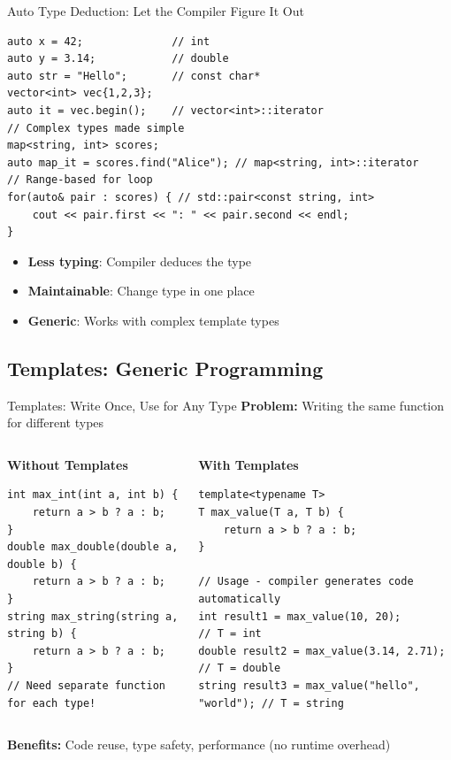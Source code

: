 \begin{frame}[fragile]{Auto Type Deduction: Let the Compiler Figure It Out}
	\begin{verbatim}
auto x = 42;              // int
auto y = 3.14;            // double
auto str = "Hello";       // const char*
vector<int> vec{1,2,3};
auto it = vec.begin();    // vector<int>::iterator
// Complex types made simple
map<string, int> scores;
auto map_it = scores.find("Alice"); // map<string, int>::iterator
// Range-based for loop
for(auto& pair : scores) { // std::pair<const string, int>
    cout << pair.first << ": " << pair.second << endl;
}
			\end{verbatim}
	\begin{itemize}
		\item \textbf{Less typing}: Compiler deduces the type
		\item \textbf{Maintainable}: Change type in one place
		\item \textbf{Generic}: Works with complex template types
	\end{itemize}
\end{frame}

\subsection{Templates: Generic Programming}

\begin{frame}[fragile]{Templates: Write Once, Use for Any Type}
	\textbf{Problem:} Writing the same function for different types
	\begin{columns}
		\begin{column}{0.5\textwidth}
			\textbf{Without Templates}
			\begin{verbatim}
int max_int(int a, int b) {
    return a > b ? a : b;
}
double max_double(double a, double b) {
    return a > b ? a : b;
}
string max_string(string a, string b) {
    return a > b ? a : b;
}
// Need separate function for each type!
            \end{verbatim}
		\end{column}
		\begin{column}{0.5\textwidth}
			\textbf{With Templates}
			\begin{verbatim}
template<typename T>
T max_value(T a, T b) {
    return a > b ? a : b;
}

// Usage - compiler generates code automatically
int result1 = max_value(10, 20);        // T = int
double result2 = max_value(3.14, 2.71); // T = double
string result3 = max_value("hello", "world"); // T = string
            \end{verbatim}
		\end{column}
	\end{columns}

	\textbf{Benefits:} Code reuse, type safety, performance (no runtime overhead)
\end{frame}

